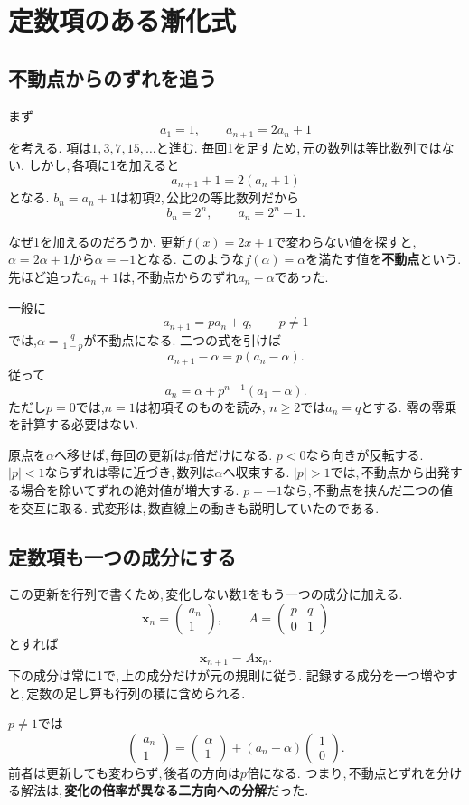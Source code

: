 \section{定数項のある漸化式}\label{節：定数項のある漸化式}
\subsection{不動点からのずれを追う}

まず
\[
 a_1=1,\qquad a_{n+1}=2a_n+1
\]
を考える. 項は$1,3,7,15,\ldots$と進む.
毎回1を足すため,\,元の数列は等比数列ではない.
しかし,\,各項に1を加えると
\[
 a_{n+1}+1=2(a_n+1)
\]
となる. $b_n=a_n+1$は初項2,\,公比2の等比数列だから
\[
 b_n=2^n,\qquad a_n=2^n-1.
\]

なぜ1を加えるのだろうか.
更新$f(x)=2x+1$で変わらない値を探すと,
$\alpha=2\alpha+1$から$\alpha=-1$となる.
このような$f(\alpha)=\alpha$を満たす値を\textbf{不動点}という.
先ほど追った$a_n+1$は,\,不動点からのずれ$a_n-\alpha$であった.

一般に
\[
 a_{n+1}=pa_n+q,\qquad p\ne1
\]
では,$\alpha=\frac{q}{1-p}$が不動点になる.
二つの式を引けば
\[
 a_{n+1}-\alpha=p(a_n-\alpha).
\]
従って
\[
 a_n=\alpha+p^{n-1}(a_1-\alpha).
\]
ただし$p=0$では,$n=1$は初項そのものを読み,
$n\ge2$では$a_n=q$とする.
零の零乗を計算する必要はない.

\NewFigFixed
原点を$\alpha$へ移せば,\,毎回の更新は$p$倍だけになる.
$p<0$なら向きが反転する.
$|p|<1$ならずれは零に近づき,\,数列は$\alpha$へ収束する.
$|p|>1$では,\,不動点から出発する場合を除いてずれの絶対値が増大する.
$p=-1$なら,\,不動点を挟んだ二つの値を交互に取る.
式変形は,\,数直線上の動きも説明していたのである.

\subsection{定数項も一つの成分にする}

この更新を行列で書くため,\,変化しない数1をもう一つの成分に加える.
\[
 \boldsymbol x_n=\begin{pmatrix}a_n\\1\end{pmatrix},
 \qquad
 A=\begin{pmatrix}p&q\\0&1\end{pmatrix}
\]
とすれば
\[
 \boldsymbol x_{n+1}=A\boldsymbol x_n.
\]
下の成分は常に1で,\,上の成分だけが元の規則に従う.
記録する成分を一つ増やすと,\,定数の足し算も行列の積に含められる.

$p\ne1$では
\[
 \begin{pmatrix}a_n\\1\end{pmatrix}
 =\begin{pmatrix}\alpha\\1\end{pmatrix}
 +(a_n-\alpha)\begin{pmatrix}1\\0\end{pmatrix}.
\]
前者は更新しても変わらず,\,後者の方向は$p$倍になる.
つまり,\,不動点とずれを分ける解法は,\,\textbf{変化の倍率が異なる二方向への分解}だった.

